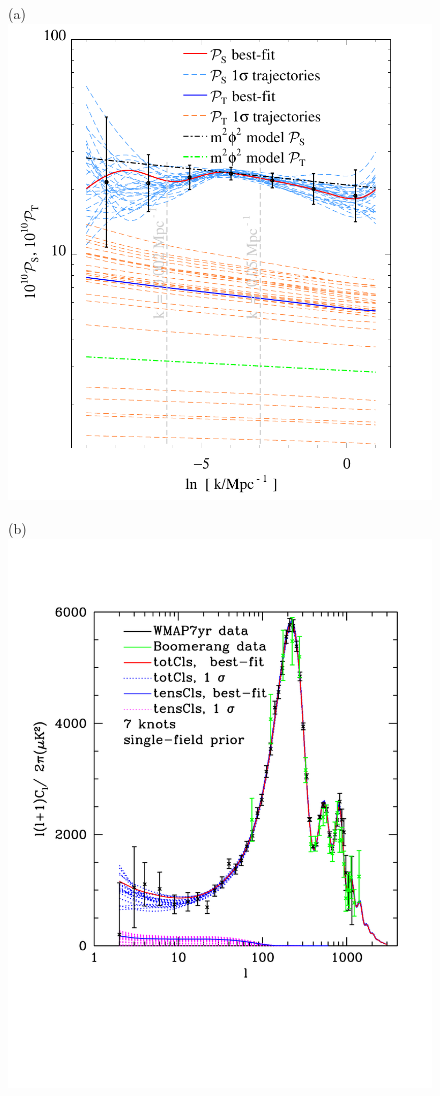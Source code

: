 \documentclass[a4paper,11pt]{article}
\begin{document}
\begin{figure}
\centering
  \in
    \begin{minipage}{0.58\linewidth}
      (a)\includegraphics[width=0.9\linewidth]{p7eps_traj11}%
    \end{minipage}
   \begin{minipage}{0.3\linewidth}
      (b)\includegraphics[width=0.9\linewidth]{p7eps_TT} \\

\end{minipage}
\end{figure}
\end{document}
